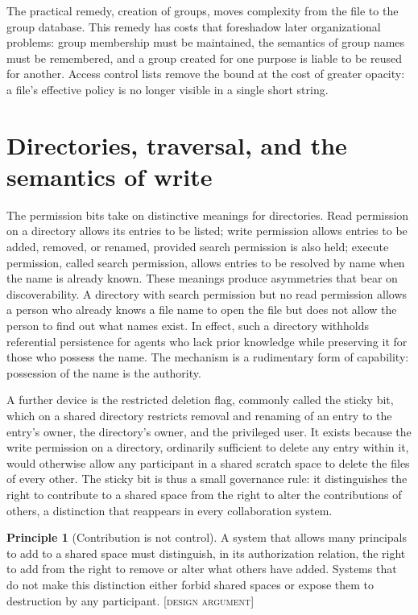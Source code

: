 \documentclass[11pt,twoside,openright]{book}
\theoremstyle{plain}
\theoremstyle{definition}
\newtheorem{principle}[theorem]{Principle}
\theoremstyle{remark}
\newcommand{\Design}{\textup{\textsc{[design argument]}}}
\begin{document}
The practical remedy, creation of groups, moves complexity from the file to the group database. This remedy has costs that foreshadow later organizational problems: group membership must be maintained, the semantics of group names must be remembered, and a group created for one purpose is liable to be reused for another. Access control lists remove the bound at the cost of greater opacity: a file's effective policy is no longer visible in a single short string.

\section{Directories, traversal, and the semantics of write}

The permission bits take on distinctive meanings for directories. Read permission on a directory allows its entries to be listed; write permission allows entries to be added, removed, or renamed, provided search permission is also held; execute permission, called search permission, allows entries to be resolved by name when the name is already known. These meanings produce asymmetries that bear on discoverability. A directory with search permission but no read permission allows a person who already knows a file name to open the file but does not allow the person to find out what names exist. In effect, such a directory withholds referential persistence for agents who lack prior knowledge while preserving it for those who possess the name. The mechanism is a rudimentary form of capability: possession of the name is the authority.

A further device is the restricted deletion flag, commonly called the sticky bit, which on a shared directory restricts removal and renaming of an entry to the entry's owner, the directory's owner, and the privileged user. It exists because the write permission on a directory, ordinarily sufficient to delete any entry within it, would otherwise allow any participant in a shared scratch space to delete the files of every other. The sticky bit is thus a small governance rule: it distinguishes the right to contribute to a shared space from the right to alter the contributions of others, a distinction that reappears in every collaboration system.

\begin{principle}[Contribution is not control]\label{pr:contribcontrol}
A system that allows many principals to add to a shared space must distinguish, in its authorization relation, the right to add from the right to remove or alter what others have added. Systems that do not make this distinction either forbid shared spaces or expose them to destruction by any participant.
\Design{}
\end{principle}
\end{document}
